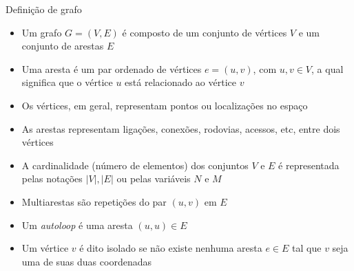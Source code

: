\begin{frame}[fragile]{Definição de grafo}

    \begin{itemize}
        \item Um grafo $G = (V, E)$ é composto de um conjunto de vértices $V$ e um conjunto de
            arestas $E$

        \item Uma aresta é um par ordenado de vértices $e = (u, v)$, com $u, v \in V$, a qual 
            significa que o vértice $u$ está relacionado ao vértice $v$

        \item Os vértices, em geral, representam pontos ou localizações no espaço

        \item As arestas representam ligações, conexões, rodovias, acessos, etc, entre dois
            vértices 

        \item A cardinalidade (número de elementos) dos conjuntos $V$ e $E$ é representada
            pelas notações $|V|, |E|$ ou pelas variáveis $N$ e $M$

        \item Multiarestas são repetições do par $(u, v)$ em $E$

        \item Um \textit{autoloop} é uma aresta $(u, u)\in E$ 

        \item Um vértice $v$ é dito isolado se não existe nenhuma aresta $e\in E$ tal que $v$ seja
            uma de suas duas coordenadas
    \end{itemize}

\end{frame}



